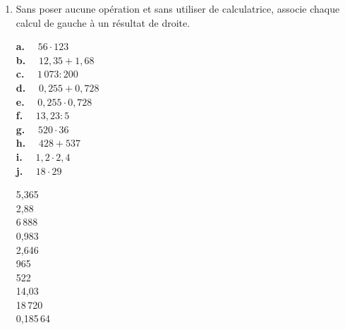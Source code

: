 \begin{activite}

\begin{enumerate}
 \item Sans poser aucune opération et sans utiliser de calculatrice, associe chaque calcul de gauche à un résultat de droite. \\[0.5em]
 
\begin{minipage}[t]{0.48\linewidth}
\begin{center}
\begin{ttableau}{0.7\linewidth}{1}
\hline {} \textbf{a.} $\quad 56 \cdot 123$ \\
\hline {} \textbf{b.} $\quad 12,35 + 1,68$ \\
\hline {} \textbf{c.} $\quad 1\,073 : 200$ \\
\hline {} \textbf{d.} $\quad 0,255 + 0,728$ \\
\hline {} \textbf{e.} $\quad 0,255 \cdot 0,728$ \\
\hline {} \textbf{f.} $\quad 13,23 : 5$ \\
\hline {} \textbf{g.} $\quad 520 \cdot 36$ \\
\hline {} \textbf{h.} $\quad 428 + 537$ \\
\hline {} \textbf{i.} $\quad 1,2 \cdot 2,4$ \\
\hline {} \textbf{j.} $\quad 18 \cdot 29$ \\
\hline
\end{ttableau}
\end{center}
\end{minipage} \hfill%
\begin{minipage}[t]{0.48\linewidth}
\begin{center}
\renewcommand*\tabularxcolumn[1]{>{\centering\arraybackslash}m{#1}}
\begin{ttableau}{0.6\linewidth}{1}
\hline {} 5,365 \\
\hline {} 2,88 \\
\hline {} 6\,888 \\
\hline {} 0,983 \\
\hline {} 2,646 \\
\hline {} 965 \\
\hline {} 522 \\
\hline {} 14,03 \\
\hline {} 18\,720 \\
\hline {} 0,185\,64 \\
\hline
\end{ttableau} 
\end{center}
 \end{minipage} \\
 

\end{enumerate}
\end{activite}
